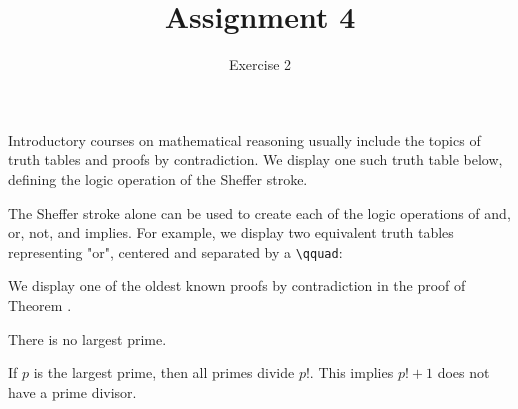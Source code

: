 \documentclass[11pt]{article}
\title{Assignment 4}
\author{Exercise 2}
\date{}
\begin{document}
\maketitle

Introductory courses on mathematical reasoning usually include the topics of truth tables and proofs by contradiction. We display one such truth table below, defining the logic operation of the Sheffer stroke. %
\begin{center}
\end{center}
The Sheffer stroke alone can be used to create each of the logic operations of and, or, not, and implies. For example, we display two equivalent truth tables representing "or", centered and separated by a \verb#\qquad#: %
\begin{center}
 \qquad {}
\end{center}

We display one of the oldest known proofs by contradiction in the proof of Theorem .

\begin{theorem} There is no largest prime. \end{theorem}

\begin{proofbyc}
    If $p$ is the largest prime, then all primes divide $p!$. This implies $p!+1$ does not have a prime divisor.
\end{proofbyc}
\end{document}
